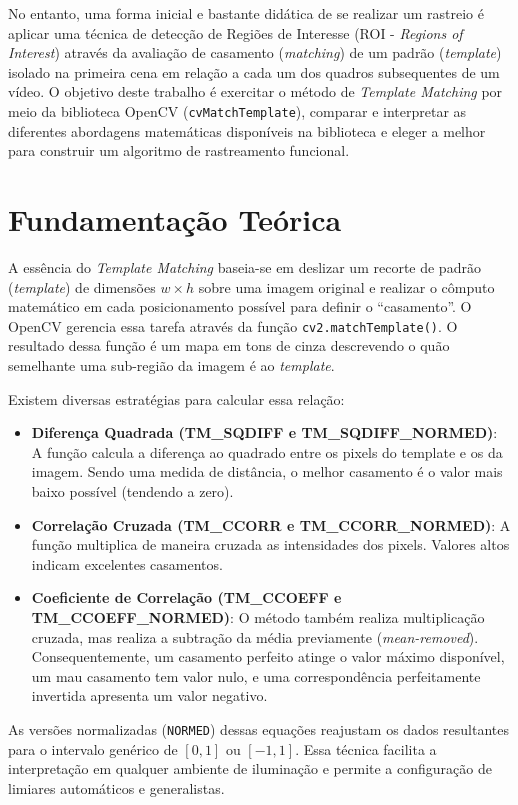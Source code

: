 \documentclass[12pt]{article}
\begin{document}
No entanto, uma forma inicial e bastante didática de se realizar um rastreio é aplicar uma técnica de detecção de Regiões de Interesse (ROI - \textit{Regions of Interest}) através da avaliação de casamento (\textit{matching}) de um padrão (\textit{template}) isolado na primeira cena em relação a cada um dos quadros subsequentes de um vídeo. O objetivo deste trabalho é exercitar o método de \textit{Template Matching} por meio da biblioteca OpenCV (\texttt{cvMatchTemplate}), comparar e interpretar as diferentes abordagens matemáticas disponíveis na biblioteca e eleger a melhor para construir um algoritmo de rastreamento funcional.

\section{Fundamentação Teórica}
A essência do \textit{Template Matching} baseia-se em deslizar um recorte de padrão (\textit{template}) de dimensões $w \times h$ sobre uma imagem original e realizar o cômputo matemático em cada posicionamento possível para definir o ``casamento''. O OpenCV gerencia essa tarefa através da função \texttt{cv2.matchTemplate()}. O resultado dessa função é um mapa em tons de cinza descrevendo o quão semelhante uma sub-região da imagem é ao \textit{template}. 

Existem diversas estratégias para calcular essa relação:
\begin{itemize}
    \item \textbf{Diferença Quadrada (TM\_SQDIFF e TM\_SQDIFF\_NORMED)}: A função calcula a diferença ao quadrado entre os pixels do template e os da imagem. Sendo uma medida de distância, o melhor casamento é o valor mais baixo possível (tendendo a zero).
    \item \textbf{Correlação Cruzada (TM\_CCORR e TM\_CCORR\_NORMED)}: A função multiplica de maneira cruzada as intensidades dos pixels. Valores altos indicam excelentes casamentos.
    \item \textbf{Coeficiente de Correlação (TM\_CCOEFF e TM\_CCOEFF\_NORMED)}: O método também realiza multiplicação cruzada, mas realiza a subtração da média previamente (\textit{mean-removed}). Consequentemente, um casamento perfeito atinge o valor máximo disponível, um mau casamento tem valor nulo, e uma correspondência perfeitamente invertida apresenta um valor negativo.
\end{itemize}

As versões normalizadas (\texttt{NORMED}) dessas equações reajustam os dados resultantes para o intervalo genérico de $[0, 1]$ ou $[-1, 1]$. Essa técnica facilita a interpretação em qualquer ambiente de iluminação e permite a configuração de limiares automáticos e generalistas.
\end{document}
